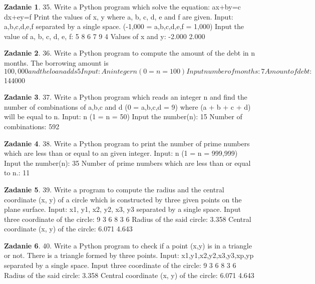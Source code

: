 \documentclass[11pt]{article}
\theoremstyle{definition}
\newtheorem{zadanie}{Zadanie}
\begin{document}
\begin{zadanie}
35. Write a Python program which solve the equation:
ax+by=c
dx+ey=f
Print the values of x, y where a, b, c, d, e and f are given.
Input:
a,b,c,d,e,f separated by a single space.
(-1,000 = a,b,c,d,e,f = 1,000)
Input the value of a, b, c, d, e, f:
5 8 6 7 9 4
Values of x and y:
-2.000 2.000
\end{zadanie}

\begin{zadanie}
36. Write a Python program to compute the amount of the debt in n months. The borrowing amount is $100,000 and the loan adds 5%
	Input:
	An integer n (0 = n = 100)
	Input number of months:
	7 Amount of debt: $144000
\end{zadanie}

\begin{zadanie}
37. Write a Python program which reads an integer n and find the number of combinations of a,b,c and d (0 = a,b,c,d = 9) where (a + b + c + d) will be equal to n.
Input:
n (1 = n = 50)
Input the number(n):
15
Number of combinations: 592
\end{zadanie}

\begin{zadanie}
38. Write a Python program to print the number of prime numbers which are less than or equal to an given integer.
Input:
n (1 = n = 999,999)
Input the number(n):
35
Number of prime numbers which are less than or equal to n.: 11
\end{zadanie}

\begin{zadanie}
39. Write a program to compute the radius and the central coordinate (x, y) of a circle which is constructed by three given points on the plane surface.
Input:
x1, y1, x2, y2, x3, y3 separated by a single space.
Input three coordinate of the circle:
9 3 6 8 3 6
Radius of the said circle:
3.358
Central coordinate (x, y) of the circle:
6.071 4.643
\end{zadanie}

\begin{zadanie}
40. Write a Python program to check if a point (x,y) is in a triangle or not. There is a triangle formed by three points.
Input:
x1,y1,x2,y2,x3,y3,xp,yp separated by a single space.
Input three coordinate of the circle:
9 3 6 8 3 6
Radius of the said circle:
3.358
Central coordinate (x, y) of the circle:
6.071 4.643
\end{zadanie}
\end{document}
